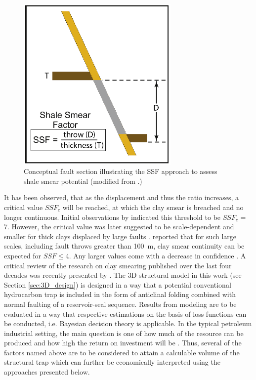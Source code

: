 		\begin{figure}[h]
			\centering
			\includegraphics[width=0.7\textwidth]{Figures/SSF.PNG}
			\caption{Conceptual fault section illustrating the SSF approach to assess shale smear potential (modified from \citet{vrolijk2016clay}.)}\label{fig:ssf}
		\end{figure}
		It has been observed, that as the displacement and thus the ratio increases, a critical value $SSF_c$ will be reached, at which the clay smear is breached and no longer continuous. Initial observations by \citet{lindsay1993outcrop} indicated this threshold to be $SSF_c$ = 7. However, the critical value was later suggested to be scale-dependent and smaller for thick clays displaced by large faults \citep{yielding2012using}. \citet{faerseth2006shale} reported that for such large scales, including fault throws greater than 100~m, clay smear continuity can be expected for $SSF\le4$. Any larger values come with a decrease in confidence \citep{faerseth2006shale}. A critical review of the research on clay smearing published over the last four decades was recently presented by \citet{vrolijk2016clay}.			
        The 3D structural model in this work (see Section \ref{sec:3D_design}) is designed in a way that a potential conventional hydrocarbon trap is included in the form of anticlinal folding combined with normal faulting of a reservoir-seal sequence. Results from modeling are to be evaluated in a way that respective estimations on the basis of loss functions can be conducted, i.e. Bayesian decision theory is applicable. In the typical petroleum industrial setting, the main question is one of how much of the resource can be produced and how high the return on investment will be \citep{dean2007volumetric}. Thus, several of the factors named above are to be considered to attain a calculable volume of the structural trap which can further be economically interpreted using the approaches presented below.
        
